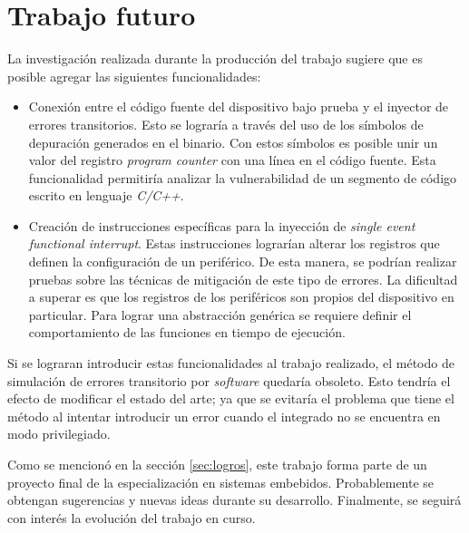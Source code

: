 \newpage

\section{Trabajo futuro}
\label{sec:futuro}

La investigación realizada durante la producción del trabajo sugiere que es posible agregar las siguientes funcionalidades:

\begin{itemize}
    \item Conexión entre el código fuente del dispositivo bajo prueba y el inyector de errores transitorios.
        Esto se lograría a través del uso de los símbolos de depuración generados en el binario.
        Con estos símbolos es posible unir un valor del registro \emph{program counter} con una línea en el código fuente.
        Esta funcionalidad permitiría analizar la vulnerabilidad de un segmento de código escrito en lenguaje \emph{C/C++}.
    \item Creación de instrucciones específicas para la inyección de \emph{single event functional interrupt}.
        Estas instrucciones lograrían alterar los registros que definen la configuración de un periférico.
        De esta manera, se podrían realizar pruebas sobre las técnicas de mitigación de este tipo de errores.
        La dificultad a superar es que los registros de los periféricos son propios del dispositivo en particular.
        Para lograr una abstracción genérica se requiere definir el comportamiento de las funciones en tiempo de ejecución.
\end{itemize}

Si se lograran introducir estas funcionalidades al trabajo realizado, el método de simulación de errores transitorio por \emph{software} quedaría obsoleto.
Esto tendría el efecto de modificar el estado del arte; ya que se evitaría el problema que tiene el método al intentar introducir un error cuando el integrado no se encuentra en modo privilegiado.

Como se mencionó en la sección \ref{sec:logros}, este trabajo forma parte de un proyecto final de la especialización en sistemas embebidos.
Probablemente se obtengan sugerencias y nuevas ideas durante su desarrollo.
Finalmente, se seguirá con interés la evolución del trabajo en curso.
